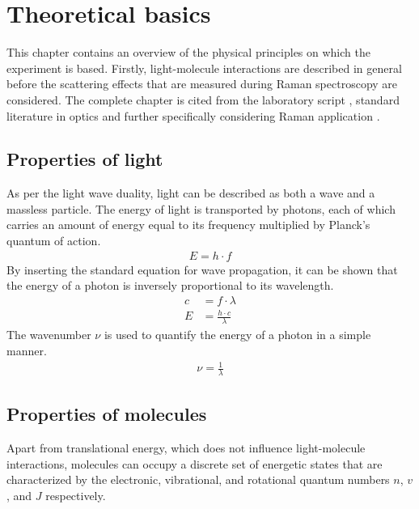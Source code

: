 
\chapter{Theoretical basics}
\label{chap:theoretical}

This chapter contains an overview of the physical principles on which the experiment is based. Firstly, light-molecule interactions are described in general before the scattering effects that are measured during Raman spectroscopy are considered. The complete chapter is cited from the laboratory script \autocite{brauerApplicationRamanSpectroscopy2022}, standard literature in optics \autocite{bornPrinciplesOpticsElectromagnetic1999,hechtOptik2005,lipsonOptik1997,niedrigOptikWellenUnd2004} and further specifically considering Raman application \autocite{herzbergMolecularSpectraMolecular2013,schraderInfraredRamanSpectroscopy1995}. 

\section{Properties of light}

As per the light wave duality, light can be described as both a wave and a massless particle. The energy of light is transported by photons, each of which carries an amount of energy equal to its frequency multiplied by Planck’s quantum of action.
\begin{align}
    E=h \cdot f
\end{align}
By inserting the standard equation for wave propagation, it can be shown that the energy of a photon is inversely proportional to its wavelength.
\begin{align}
    c&=f \cdot \lambda \\
    E&= \frac{h \cdot c}{\lambda}
\end{align}
The wavenumber $\nu$ is used to quantify the energy of a photon in a simple manner.
\begin{align}
    \nu=\frac{1}{\lambda}
\end{align}

\section{Properties of molecules}

Apart from translational energy, which does not influence light-molecule interactions, molecules can occupy a discrete set of energetic states that are characterized by the electronic, vibrational, and rotational quantum numbers $n$, $v$, and $J$ respectively.

